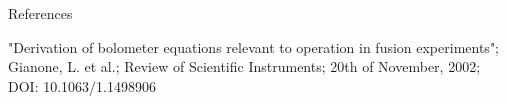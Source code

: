 \documentclass[final]{beamer}
\begin{document}
\begin{frame}
\begin{minipage}[t]{0.39\textwidth}
\begin{kasten}{References}
{\begin{thebibliography}{}
                    "Derivation of bolometer equations relevant to %
                    operation in fusion experiments"; %
                    Gianone, L. et al.; Review of Scientific Instruments; %
                    20th of November, 2002; DOI: 10.1063/1.1498906%
            \end{thebibliography}}%
        \end{kasten}


\end{minipage}
\end{frame}
\end{document}
